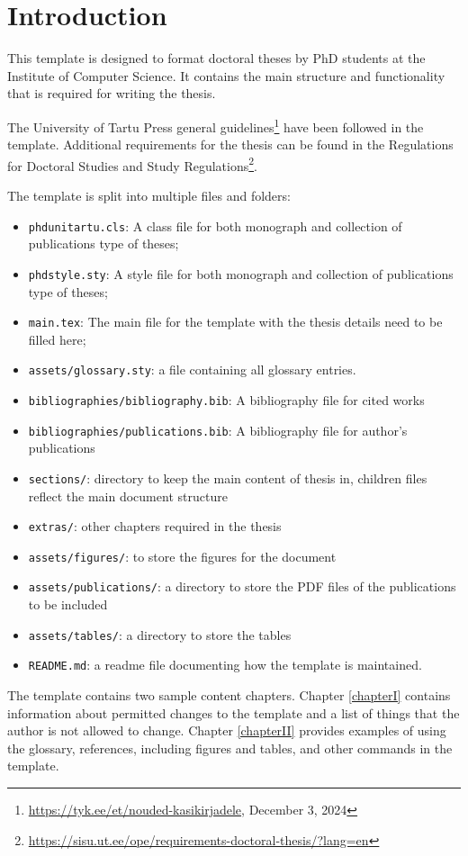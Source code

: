 \chapter{Introduction}

This template is designed to format doctoral theses by PhD students at the Institute of Computer Science. It contains the main structure and functionality that is required for writing the thesis.

The University of Tartu Press general guidelines\footnote{\url{https://tyk.ee/et/nouded-kasikirjadele}, December 3, 2024} have been followed in the template. Additional requirements for the thesis can be found in the Regulations for Doctoral Studies and Study Regulations\footnote{\url{https://sisu.ut.ee/ope/requirements-doctoral-thesis/?lang=en}}.

The template is split into multiple files and folders:

\begin{itemize}
\item \texttt{phdunitartu.cls}: A class file for both monograph and collection of publications type of theses;
\item \texttt{phdstyle.sty}: A style file for both monograph and collection of publications type of theses;
\item \texttt{main.tex}: The main file for the template with the thesis details need to be filled here;
\item \texttt{assets/glossary.sty}: a file containing all glossary entries.
\item \texttt{bibliographies/bibliography.bib}: A bibliography file for cited works
\item \texttt{bibliographies/publications.bib}: A bibliography file for author's publications
\item \texttt{sections/}: directory to keep the main content of thesis in, children files reflect the main document structure
\item \texttt{extras/}: other chapters required in the thesis
\item \texttt{assets/figures/}: to store the figures for the document
\item \texttt{assets/publications/}: a directory to store the PDF files of the publications to be included
\item \texttt{assets/tables/}: a directory to store the tables
\item \texttt{README.md}: a readme file documenting how the template is maintained.
\end{itemize}

The template contains two sample content chapters. Chapter \ref{chapterI} contains information about permitted changes to the template and a list of things that the author is not allowed to change. Chapter \ref{chapterII} provides examples of using the glossary, references, including figures and tables, and other commands in the template.